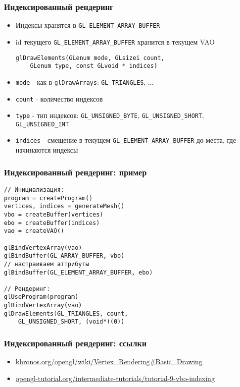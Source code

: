 \documentclass{beamer}
\begin{document}
\begin{frame}[fragile]
\frametitle{Индексированный рендеринг}
\begin{itemize}
\item Индексы хранятся в \verb|GL_ELEMENT_ARRAY_BUFFER|
\item id текущего \verb|GL_ELEMENT_ARRAY_BUFFER| хранится в текущем VAO
\pause
\begin{verbatim}
glDrawElements(GLenum mode, GLsizei count,
    GLenum type, const GLvoid * indices)
\end{verbatim}
\pause
\item \verb|mode| - как в \verb|glDrawArrays|: \verb|GL_TRIANGLES|, ...
\pause
\item \verb|count| - количество индексов
\pause
\item \verb|type| - тип индексов: \verb|GL_UNSIGNED_BYTE|, \verb|GL_UNSIGNED_SHORT|, \verb|GL_UNSIGNED_INT|
\pause
\item \verb|indices| - смещение в текущем \verb|GL_ELEMENT_ARRAY_BUFFER| до места, где начинаются индексы
\end{itemize}
\end{frame}

\begin{frame}[fragile]
\frametitle{Индексированный рендеринг: пример}
\fontsize{10pt}{10pt}
\begin{verbatim}
// Инициализация:
program = createProgram()
vertices, indices = generateMesh()
vbo = createBuffer(vertices)
ebo = createBuffer(indices)
vao = createVAO()

glBindVertexArray(vao)
glBindBuffer(GL_ARRAY_BUFFER, vbo)
// настраиваем аттрибуты
glBindBuffer(GL_ELEMENT_ARRAY_BUFFER, ebo)

// Рендеринг:
glUseProgram(program)
glBindVertexArray(vao)
glDrawElements(GL_TRIANGLES, count,
    GL_UNSIGNED_SHORT, (void*)(0))
\end{verbatim}
\end{frame}

\begin{frame}[fragile]
\frametitle{Индексированный рендеринг: ссылки}
\fontsize{10pt}{10pt}
\begin{itemize}
\item \href{https://www.khronos.org/opengl/wiki/Vertex_Rendering#Basic_Drawing}{khronos.org/opengl/wiki/Vertex\_Rendering\#Basic\_Drawing}
\item \href{http://www.opengl-tutorial.org/intermediate-tutorials/tutorial-9-vbo-indexing}{opengl-tutorial.org/intermediate-tutorials/tutorial-9-vbo-indexing}
\end{itemize}
\end{frame}
\end{document}
